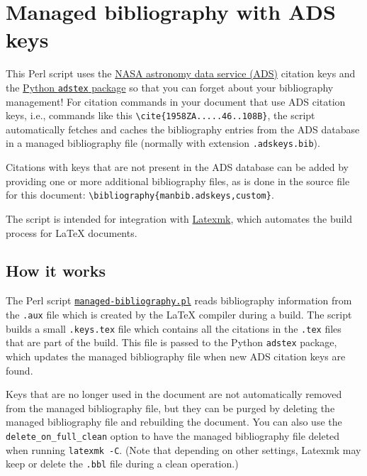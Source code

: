 \section{Managed bibliography with ADS
keys}\label{managed-bibliography-with-ads-keys}

This Perl script uses the \href{https://ui.adsabs.harvard.edu/}{NASA
astronomy data service (ADS)} citation keys and the
\href{https://github.com/yymao/adstex}{Python \texttt{adstex} package}
so that you can forget about your bibliography management! For citation
commands in your document that use ADS citation keys, i.e., commands
like this \texttt{\textbackslash{}cite\{1958ZA.....46..108B\}}, the
script automatically fetches and caches the bibliography entries from
the ADS database in a managed bibliography file (normally with extension
\texttt{.adskeys.bib}).

Citations with keys that are not present in the ADS database can be
added by providing one or more additional bibliography files, as is done
in the source file for this document:
\texttt{\textbackslash{}bibliography\{manbib.adskeys,custom\}}.

The script is intended for integration with
\href{https://ctan.org/pkg/latexmk/}{Latexmk}, which automates the build
process for LaTeX documents.

\subsection{How it works}\label{how-it-works}

The Perl script
\href{./managed-bibliography.pl}{\texttt{managed-bibliography.pl}} reads
bibliography information from the \texttt{.aux} file which is created by
the LaTeX compiler during a build. The script builds a small
\texttt{.keys.tex} file which contains all the citations in the
\texttt{.tex} files that are part of the build. This file is passed to
the Python \texttt{adstex} package, which updates the managed
bibliography file when new ADS citation keys are found.

Keys that are no longer used in the document are not automatically
removed from the managed bibliography file, but they can be purged by
deleting the managed bibliography file and rebuilding the document. You
can also use the \texttt{delete\_on\_full\_clean} option to have the
managed bibliography file deleted when running \texttt{latexmk\ -C}.
(Note that depending on other settings, Latexmk may keep or delete the
\texttt{.bbl} file during a clean operation.)

